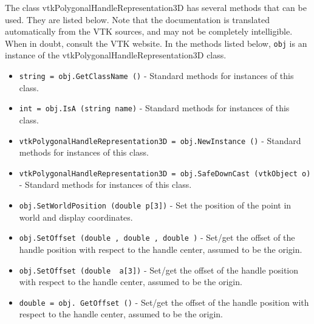 The class vtkPolygonalHandleRepresentation3D has several methods that can be used.
  They are listed below.
Note that the documentation is translated automatically from the VTK sources,
and may not be completely intelligible.  When in doubt, consult the VTK website.
In the methods listed below, \verb|obj| is an instance of the vtkPolygonalHandleRepresentation3D class.
\begin{itemize}
\item  \verb|string = obj.GetClassName ()| -  Standard methods for instances of this class.

\item  \verb|int = obj.IsA (string name)| -  Standard methods for instances of this class.

\item  \verb|vtkPolygonalHandleRepresentation3D = obj.NewInstance ()| -  Standard methods for instances of this class.

\item  \verb|vtkPolygonalHandleRepresentation3D = obj.SafeDownCast (vtkObject o)| -  Standard methods for instances of this class.

\item  \verb|obj.SetWorldPosition (double p[3])| -  Set the position of the point in world and display coordinates.

\item  \verb|obj.SetOffset (double , double , double )| -  Set/get the offset of the handle position with respect to the handle 
 center, assumed to be the origin.

\item  \verb|obj.SetOffset (double  a[3])| -  Set/get the offset of the handle position with respect to the handle 
 center, assumed to be the origin.

\item  \verb|double = obj. GetOffset ()| -  Set/get the offset of the handle position with respect to the handle 
 center, assumed to be the origin.

\end{itemize}
